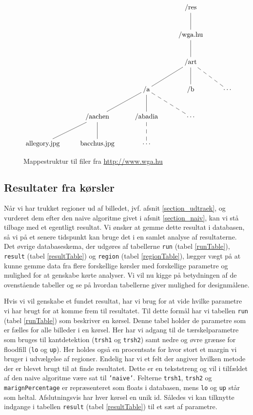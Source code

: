 {%
\begin{figure}[!h]
    \centering
$
\xymatrix{
 &  &   & \ar @{-} [d] \textrm{/res}  &                                                     \\
 &  &   & \ar @{-} [d] \textrm{/wga.hu}  &                                                  \\
 &  &   & \ar @{-} [dl] \ar @{-} [d] \ar @{--} [dr] \textrm{/art} &                         \\
 &  & \ar @{-} [dl] \ar @{-} [d] \ar @{--} [dr] \textrm{/a} & \textrm{/b} & \cdots          \\
 & \ar @{-} [dl] \ar @{-} [d] \textrm{/aachen} & \ar @{--} [d] \textrm{/abadia} & \cdots    \\
\textrm{allegory.jpg} & \textrm{bacchus.jpg} & \cdots &   &
}
$
    \caption{Mappestruktur til filer fra
        \href{http://www.wga.hu}{http://www.wga.hu}}
    \label{mappestruktur}
\end{figure}

\subsection{Resultater fra kørsler\label{section_results}}
Når vi har trukket regioner ud af billedet, jvf. afsnit
\ref{section_udtraek}, og vurderet dem efter den naive algoritme givet i
afsnit \ref{section_naiv}, kan vi stå tilbage med et egentligt
resultat. Vi ønsker at gemme dette resultat i databasen, så vi på et
senere tidspunkt kan bruge det i en samlet analyse af resultaterne. Det
øvrige databaseskema, der udgøres af tabellerne \texttt{run} (tabel
\ref{runTable}), \texttt{result} (tabel \ref{resultTable}) og
\texttt{region} (tabel \ref{regionTable}), lægger vægt på at kunne gemme
data fra flere forskellige kørsler med forskellige parametre og mulighed
for at genskabe kørte analyser. Vi vil nu kigge på betydningen af de
ovenstående tabeller og se på hvordan tabellerne giver mulighed for
designmålene.

Hvis vi vil genskabe et fundet resultat, har vi brug for at vide hvilke
parametre vi har brugt for at komme frem til resultatet. Til dette
formål har vi tabellen \texttt{run} (tabel \ref{runTable}) som beskriver
en kørsel. Denne tabel holder de parametre som er fælles for alle
billeder i en kørsel. Her har vi adgang til de tærskelparametre som
bruges til kantdetektion (\texttt{trsh1} og \texttt{trsh2}) samt nedre
og øvre grænse for floodfill (\texttt{lo} og \texttt{up}). Her holdes
også en procentsats for hvor stort et margin vi bruger i udvælgelse af
regioner. Endelig har vi et felt der angiver hvilken metode der er
blevet brugt til at finde resultatet. Dette er en tekststreng og vil i
tilfældet af den naive algoritme være sat til \texttt{'naive'}. Felterne
\texttt{trsh1}, \texttt{trsh2} og \texttt{marignPercentage} er
repræsenteret som floats i databasen, mens \texttt{lo} og \texttt{up}
står som heltal. Afslutningsvis har hver kørsel en unik id. Således vi
kan tilknytte indgange i tabellen \texttt{result} (tabel
\ref{resultTable}) til et sæt af parametre.

}
